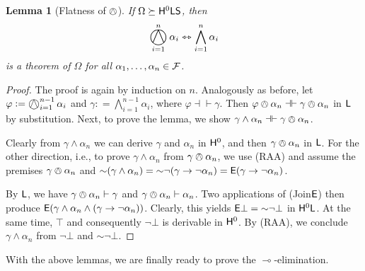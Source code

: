 \documentclass[a4paper,english,fleqn,11pt,final]{scrartcl}
\makeatletter
\newcommand{\ie}{i.e.\@\xspace}
\newcommand{\logicOpFont}[1]{\mathsf{#1}}
\newcommand{\negg}{{\sim}}
\newcommand{\E}{\protect\ensuremath\logicOpFont{E}}
\newcommand{\calF}{\protect\ensuremath{\mathcal{F}}}
\newcommand{\sfS}{\protect\ensuremath{\mathsf{S}}}
\newcommand{\sfH}{\protect\ensuremath{\mathsf{H}}}
\newcommand{\sfL}{\protect\ensuremath{\mathsf{L}}}
\providecommand{\dfn}{\mathrel{\mathop:}=}
\newcommand{\imp}{\rightarrow}
\newcommand{\limp}{\multimap}
\newcommand{\tequiv}{\leftrightarrowtriangle}
\newcommand{\eqpr}{\dashv\vdash}
\newcommand{\Deriv}[1]{{\normalfont\textsf{#1}}}
\newcommand{\oland}{\owedge}
\DeclareMathOperator*{\bigoland}{\scalerel*{\owedge}{\sum}}
\theoremstyle{plain}
\newtheorem{lemma}[theorem]{Lemma}
\theoremstyle{definition}
\makeatother
\begin{document}
\begin{lemma}[Flatness of $\owedge$]\label{lem:flatness-transform2}
If $\Omega \succeq \sfH^0\sfL\sfS$, then
\[
\bigoland_{i=1}^n\alpha_i \tequiv \bigwedge_{i=1}^n\alpha_i
\]
is a theorem of $\Omega$ for all $\alpha_1, \ldots,\alpha_n \in \calF$.
\end{lemma}
\begin{proof}
The proof is again by induction on $n$.
Analogously as before, let $\varphi \dfn \bigoland_{i=1}^{n-1}\alpha_i$ and $\gamma\dfn \bigwedge_{i=1}^{n-1} \alpha_i$, where $\varphi \eqpr \gamma$.
Then $\varphi\oland\alpha_n \eqpr \gamma\oland \alpha_n$ in $\sfL$ by substitution.
Next, to prove the lemma, we show $\gamma\land\alpha_n \eqpr \gamma\oland\alpha_n$.

Clearly from $\gamma\land \alpha_n$ we can derive $\gamma$ and $\alpha_n$ in $\sfH^0$, and then $\gamma \oland\alpha_n$ in $\sfL$.
For the other direction, \ie, to prove $\gamma\land\alpha_n$ from $\gamma\oland\alpha_n$, we use \Deriv{(RAA)} and assume the premises $\gamma\oland\alpha_n$ and $\negg(\gamma\land\alpha_n) = \negg \neg(\gamma\imp \neg\alpha_n) = \E(\gamma\imp\neg\alpha_n)$.

By $\sfL$, we have $\gamma \oland \alpha_n \vdash \gamma$ and $\gamma \oland \alpha_n \vdash \alpha_n$.
Two applications of \Deriv{(Join$\E$)} then produce $\E(\gamma \land \alpha_n \land (\gamma\imp\neg\alpha_n))$.
Clearly, this yields $\E\bot = \negg \neg \bot$ in $\sfH^0\sfL$.
At the same time, $\top$ and consequently $\neg \bot$ is derivable in $\sfH^0$.
By \Deriv{(RAA)}, we conclude $\gamma\land\alpha_n$ from $\neg \bot$ and $\negg \neg \bot$.
\end{proof}



With the above lemmas, we are finally ready to prove the $\limp$-elimination.
\end{document}
